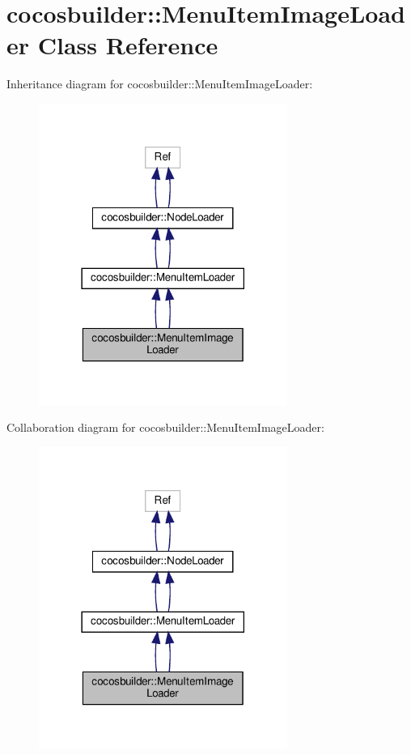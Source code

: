 \hypertarget{classcocosbuilder_1_1MenuItemImageLoader}{}\section{cocosbuilder\+:\+:Menu\+Item\+Image\+Loader Class Reference}
\label{classcocosbuilder_1_1MenuItemImageLoader}


Inheritance diagram for cocosbuilder\+:\+:Menu\+Item\+Image\+Loader\+:
\nopagebreak
\begin{figure}[H]
\begin{center}
\leavevmode
\includegraphics[width=230pt]{classcocosbuilder_1_1MenuItemImageLoader__inherit__graph}
\end{center}
\end{figure}


Collaboration diagram for cocosbuilder\+:\+:Menu\+Item\+Image\+Loader\+:
\nopagebreak
\begin{figure}[H]
\begin{center}
\leavevmode
\includegraphics[width=230pt]{classcocosbuilder_1_1MenuItemImageLoader__coll__graph}
\end{center}
\end{figure}
